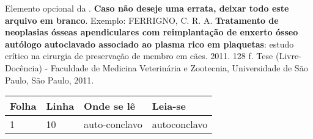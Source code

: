 \begin{errata}
Elemento opcional da . \textbf{Caso não
deseje uma errata, deixar todo este arquivo em branco}. Exemplo:
\vspace{\onelineskip}
FERRIGNO, C. R. A. \textbf{Tratamento de neoplasias ósseas apendiculares com
reimplantação de enxerto ósseo autólogo autoclavado associado ao plasma
rico em plaquetas}: estudo crítico na cirurgia de preservação de membro em
cães. 2011. 128 f. Tese (Livre-Docência) - Faculdade de Medicina Veterinária e
Zootecnia, Universidade de São Paulo, São Paulo, 2011.
\begin{table}[htb]
\center
\footnotesize
\begin{tabular}{|p{1.4cm}|p{1cm}|p{3cm}|p{3cm}|}
\hline
\textbf{Folha} & \textbf{Linha} & \textbf{Onde se lê} & \textbf{Leia-se} \\
\hline
1 & 10 & auto-conclavo & autoconclavo\\
\hline
\end{tabular}
\end{table}
\end{errata}